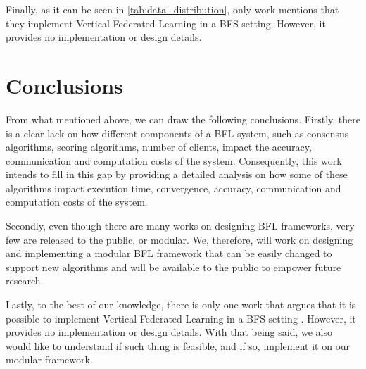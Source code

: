Finally, as it can be seen in \autoref{tab:data_distribution}, only work \cite{10.48550/arxiv.1912.04859} mentions that they implement Vertical Federated Learning in a BFS setting. However, it provides no implementation or design details.

\section{Conclusions}\label{related_work:conclusions}

From what mentioned above, we can draw the following conclusions. Firstly, there is a clear lack on how different components of a BFL system, such as consensus algorithms, scoring algorithms, number of clients, impact the accuracy, communication and computation costs of the system. Consequently, this work intends to fill in this gap by providing a detailed analysis on how some of these algorithms impact execution time, convergence, accuracy, communication and computation costs of the system.

Secondly, even though there are many works on designing BFL frameworks, very few are released to the public, or modular. We, therefore, will work on designing and implementing a modular BFL framework that can be easily changed to support new algorithms and will be available to the public to empower future research.

Lastly, to the best of our knowledge, there is only one work that argues that it is possible to implement Vertical Federated Learning in a BFS setting \cite{10.48550/arxiv.1912.04859}. However, it provides no implementation or design details. With that being said, we also would like to understand if such thing is feasible, and if so, implement it on our modular framework.




